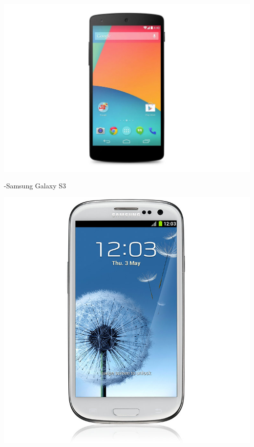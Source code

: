 \begin{center}
\includegraphics[width=1\textwidth]{imgs/nexus5.jpg}
\label{nexus_5_img}%
\end{center}
\newpage

-Samsung Galaxy S3

\begin{center}
\includegraphics[width=1\textwidth]{imgs/galaxy_s3.jpg}
\label{galaxys3_img}%
\end{center}
\newpage

